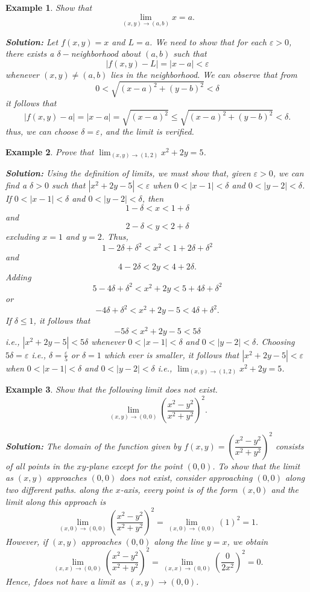 \documentclass[titlepage,a4paper,12pt]{report}
\newtheorem{example}{Example}[section]
\begin{document}
 \begin{example}
 Show that \[\lim _{(x,y)\rightarrow (a,b)}x =a.\] 
 
 \noindent \textbf{Solution:} Let $f(x,y)=x$ and $L=a$. We need to show that for each $\varepsilon >0$, there exists a $\delta-$neighborhood about $(a,b)$ such that 
 \[|f(x,y)-L| =|x-a|<\varepsilon\] whenever $(x,y)\neq (a,b)$ lies in the neighborhood. We can observe that from \[0<\sqrt{(x-a)^2+(y-b)^2}<\delta\] it follows that 
 \[|f(x,y)-a|=|x-a|=\sqrt{(x-a)^2}\leq \sqrt{(x-a)^2+(y-b)^2}<\delta.\] thus, we can choose $\delta = \varepsilon$, and the limit is verified.
 \end{example}
 \begin{example}
 Prove that $\displaystyle \lim _{(x,y)\rightarrow (1,2)}x^2+2y=5$.
 
 \noindent \textbf{Solution:} Using the definition of limits, we must show that, given $\varepsilon >0$, we can find a $\delta >0$ such that $|x^2+2y-5|<\varepsilon$ when $0<|x-1|<\delta$ and $0<|y-2|<\delta$. If $0<|x-1|<\delta$ and $0<|y-2|<\delta$, then 
 \[1-\delta <x<1+\delta\] and \[2-\delta <y<2+\delta\] excluding $x=1$ and $y=2$. Thus, 
 \[1-2\delta +\delta ^2 <x^2<1+2\delta +\delta ^2\] and \[4-2\delta <2y<4+2\delta.\]
 Adding 
 \[5-4\delta +\delta ^2 <x^2+2y <5+4\delta +\delta ^2\] or 
 \[-4\delta +\delta ^2 <x^2+2y-5<4\delta +\delta ^2.\] If $\delta \leq 1$, it follows that 
 \[-5\delta<x^2+2y-5<5\delta\] i.e., $|x^2+2y-5|<5\delta$ whenever $0<|x-1|<\delta$ and $0<|y-2|<\delta$. Choosing $5\delta =\varepsilon$ i.e., $\delta =\frac{\varepsilon}{5}$ or $\delta =1$ which ever is smaller, it follows that $|x^2+2y-5|<\varepsilon$ when $0<|x-1|<\delta$ and $0<|y-2|<\delta$ i.e., $\displaystyle \lim _{(x,y)\rightarrow (1,2)}x^2+2y=5$.
 \end{example}
 \begin{example}
 Show that the following limit does not exist.
 \[\lim _{(x,y)\rightarrow (0,0)}\left(\dfrac{x^2-y^2}{x^2+y^2}\right)^2.\]
 
 \noindent \textbf{Solution:}  The domain of the function given by $f(x,y)=\left(\dfrac{x^2-y^2}{x^2+y^2}\right)^2$ consists of all points in the $xy$-plane except for the point $(0,0)$. To show that the limit as $(x,y)$ approaches $(0,0)$ does not exist, consider approaching $(0,0)$ along two different paths. along the $x$-axis, every point is of the form $(x,0)$ and the limit along this approach is 
 \[\lim _{(x,0)\rightarrow (0,0)}\left(\dfrac{x^2-y^2}{x^2+y^2}\right)^2 =\lim _ {(x,0)\rightarrow (0,0)}(1)^2=1.\] However, if $(x,y)$ approaches $(0,0)$ along the line $y=x$, we obtain 
 \[\lim _{(x,x)\rightarrow (0,0)}\left(\dfrac{x^2-y^2}{x^2+y^2}\right)^2 =\lim _{(x,x)\rightarrow (0,0)}\left(\dfrac{0}{2x^2}\right)^2=0. \] Hence, $f $does not have a limit as $(x,y)\rightarrow (0,0)$.
 \end{example}
\end{document}

